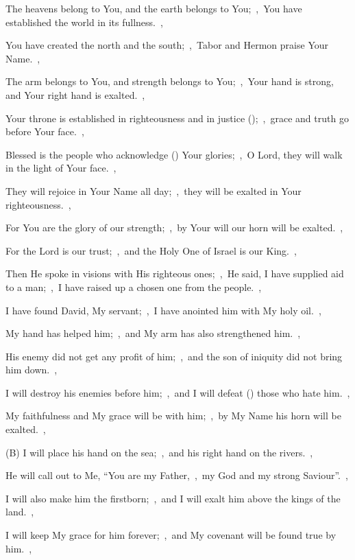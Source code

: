 \documentclass[12pt,twoside,a5paper]{article}
\begin{document}
\begin{normalparskip}
  The heavens belong to You, and the earth belongs to You;~\sep\ You have established the world in its fullness.~\sep

  You have created the north and the south;~\sep\ Tabor and Hermon praise Your Name.~\sep

  The arm belongs to You, and strength belongs to You;~\sep\ Your hand is strong, and Your right hand is exalted.~\sep

  Your throne is established in righteousness and in justice ();~\sep\ grace and truth go before Your face.~\sep

  Blessed is the people who acknowledge () Your glories;~\sep\ O Lord, they will walk in the light of Your face.~\sep

  They will rejoice in Your Name all day;~\sep\ they will be exalted in Your righteousness.~\sep

  For You are the glory of our strength;~\sep\ by Your will our horn will be exalted.~\sep

  For the Lord is our trust;~\sep\ and the Holy One of Israel is our King.~\sep

  Then He spoke in visions with His righteous ones;~\sep\ He said, I have supplied aid to a man;~\sep\ I have raised up a chosen one from the people.~\sep

  I have found David, My servant;~\sep\ I have anointed him with My holy oil.~\sep

  My hand has helped him;~\sep\ and My arm has also strengthened him.~\sep

  His enemy did not get any profit of him;~\sep\ and the son of iniquity did not bring him down.~\sep

  I will destroy his enemies before him;~\sep\ and I will defeat () those who hate him.~\sep

  My faithfulness and My grace will be with him;~\sep\ by My Name his horn will be exalted.~\sep

  (B) I will place his hand on the sea;~\sep\ and his right hand on the rivers.~\sep

  He will call out to Me, ``You are my Father,~\sep\ my God and my strong Saviour''.~\sep

  I will also make him the firstborn;~\sep\ and I will exalt him above the kings of the land.~\sep

  I will keep My grace for him forever;~\sep\ and My covenant will be found true by him.~\sep


\end{normalparskip}
\end{document}
